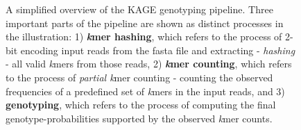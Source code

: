 \begin{figure}[H]
\begin{center}
{
}
\caption{
  A simplified overview of the KAGE genotyping pipeline.
  Three important parts of the pipeline are shown as distinct processes in the illustration: 
  1) \textbf{\textit{k}mer hashing}, which refers to the process of 2-bit encoding input reads from the fasta file and extracting - \textit{hashing} - all valid \textit{k}mers from those reads, 
  2) \textbf{\textit{k}mer counting}, which refers to the process of \textit{partial k}mer counting - counting the observed frequencies of a predefined set of \textit{k}mers in the input reads, and 
  3) \textbf{genotyping}, which refers to the process of computing the final genotype-probabilities supported by the observed \textit{k}mer counts.
}
\label{background:kage:figures:pipeline}
\end{center}
\end{figure}

